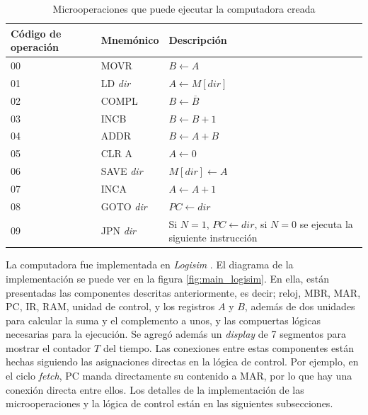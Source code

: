 \documentclass{article}
\begin{document}
\begin{table}[h]
    \centering
    \caption{Microoperaciones que puede ejecutar la computadora creada}
    \begin{tabular}{|l|l|l|}
    \hline
    Código de operación & Mnemónico & Descripción                                                                                  \\ \hline
    00                  & MOVR      & $B \leftarrow A$                                                                             \\ \hline
    01                  & LD \textit{dir}    & $A \leftarrow M[dir]$                                                                        \\ \hline
    02                  & COMPL     & $B \leftarrow \overline{B}$                                                                  \\ \hline
    03                  & INCB      & $ B \leftarrow B + 1$                                                                        \\ \hline
    04                  & ADDR      & $B \leftarrow A + B$                                                                         \\ \hline
    05                  & CLR A     & $A \leftarrow 0$                                                                             \\ \hline
    06                  & SAVE \textit{dir}  & $M[dir] \leftarrow A$                                                                        \\ \hline
    07                  & INCA      & $A \leftarrow A + 1$                                                                         \\ \hline
    08                  & GOTO \textit{dir}  & $PC \leftarrow dir$                                                                          \\ \hline
    09                  & JPN \textit{dir}   & Si $N = 1$, $PC \leftarrow dir$, si $N = 0$ se ejecuta la siguiente instrucción               \\ \hline
    \end{tabular}    
    \label{tab:microoperaciones_maq}
\end{table}


La computadora fue implementada en \textit{Logisim} \cite{Burch_2002}. El diagrama de la implementación se puede ver en la figura \ref{fig:main_logisim}. En ella, están presentadas las componentes descritas anteriormente, es decir; reloj, MBR, MAR, PC, IR, RAM, unidad de control, y los registros $A$ y $B$, además de dos unidades para calcular la suma y el complemento a unos, y las compuertas lógicas necesarias para la ejecución. Se agregó además un \textit{display} de 7 segmentos para mostrar el contador $T$ del tiempo. Las conexiones entre estas componentes están hechas siguiendo las asignaciones directas en la lógica de control. Por ejemplo, en el ciclo \textit{fetch}, PC manda directamente su contenido a MAR, por lo que hay una conexión directa entre ellos. Los detalles de la implementación de las microoperaciones y la lógica de control están en las siguientes subsecciones.
\end{document}
